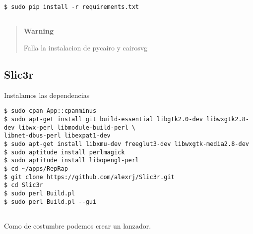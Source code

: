 \begin{verbatim}
$ sudo pip install -r requirements.txt
      
\end{verbatim}

\begin{quote}
\textbf{Warning}

Falla la instalacion de pycairo y cairosvg
\end{quote}

\subsection{Slic3r}\label{slic3r}

Instalamos las dependencias

\begin{verbatim}
$ sudo cpan App::cpanminus
$ sudo apt-get install git build-essential libgtk2.0-dev libwxgtk2.8-dev libwx-perl libmodule-build-perl \
libnet-dbus-perl libexpat1-dev
$ sudo apt-get install libxmu-dev freeglut3-dev libwxgtk-media2.8-dev
$ sudo aptitude install perlmagick
$ sudo aptitude install libopengl-perl
$ cd ~/apps/RepRap
$ git clone https://github.com/alexrj/Slic3r.git
$ cd Slic3r
$ sudo perl Build.pl
$ sudo perl Build.pl --gui
      
\end{verbatim}

Como de costumbre podemos crear un lanzador.
